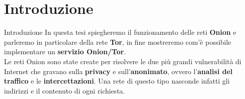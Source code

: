 \section{Introduzione}
\begin{frame}{Introduzione}
    \centering
    In questa tesi spiegheremo il funzionamento delle reti \textbf{Onion} e parleremo in particolare della rete \textbf{Tor}, in fine mostreremo com'è possibile implementare un \textbf{servizio Onion/Tor}. \\
    Le reti Onion sono state create per risolvere le due più grandi vulnerabilità di Internet che gravano sulla \textbf{privacy} e sull'\textbf{anonimato}, ovvero l'\textbf{analisi del traffico} e le \textbf{intercettazioni}. 
    Una rete di questo tipo nasconde infatti gli indirizzi e il contenuto di ogni richiesta.
\end{frame}